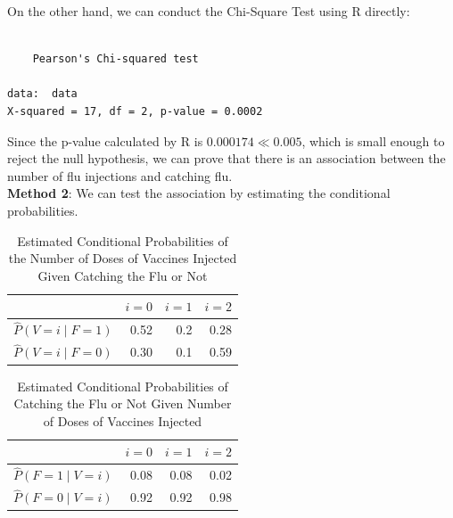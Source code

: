 \documentclass[
]{book}
\begin{document}
On the other hand, we can conduct the Chi-Square Test using R directly:

\begin{verbatim}

    Pearson's Chi-squared test

data:  data
X-squared = 17, df = 2, p-value = 0.0002
\end{verbatim}

Since the p-value calculated by R is \(0.000174 \ll 0.005\), which is small enough to reject the null hypothesis, we can prove that there is an association between the number of flu injections and catching flu.\\

\textbf{Method 2}: We can test the association by estimating the conditional probabilities.

\begin{table}

\caption{\label{tab:unnamed-chunk-11}Estimated Conditional Probabilities of the Number of Doses of Vaccines Injected Given Catching the Flu or Not}
\centering
\begin{tabular}[t]{l|r|r|r}
\hline
  & $i = 0$ & $i = 1$ & $i = 2$\\
\hline
$\hat{P}(V = i \mid F = 1)$ & 0.52 & 0.2 & 0.28\\
\hline
$\hat{P}(V = i \mid F = 0)$ & 0.30 & 0.1 & 0.59\\
\hline
\end{tabular}
\end{table}

\begin{table}

\caption{\label{tab:unnamed-chunk-11}Estimated Conditional Probabilities of Catching the Flu or Not Given Number of Doses of Vaccines Injected}
\centering
\begin{tabular}[t]{l|r|r|r}
\hline
  & $i = 0$ & $i = 1$ & $i = 2$\\
\hline
$\hat{P}(F = 1 \mid V = i)$ & 0.08 & 0.08 & 0.02\\
\hline
$\hat{P}(F = 0 \mid V = i)$ & 0.92 & 0.92 & 0.98\\
\hline
\end{tabular}
\end{table}
\end{document}
